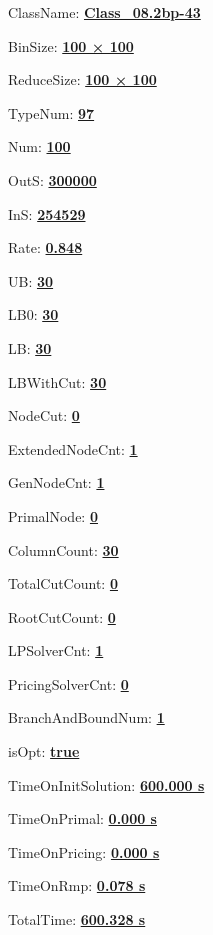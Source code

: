 \documentclass[11pt]{article}
\begin{document}
\pagestyle{empty}


ClassName: \underline{\textbf{Class_08.2bp-43}}
\par
BinSize: \underline{\textbf{100 × 100}}
\par
ReduceSize: \underline{\textbf{100 × 100}}
\par
TypeNum: \underline{\textbf{97}}
\par
Num: \underline{\textbf{100}}
\par
OutS: \underline{\textbf{300000}}
\par
InS: \underline{\textbf{254529}}
\par
Rate: \underline{\textbf{0.848}}
\par
UB: \underline{\textbf{30}}
\par
LB0: \underline{\textbf{30}}
\par
LB: \underline{\textbf{30}}
\par
LBWithCut: \underline{\textbf{30}}
\par
NodeCut: \underline{\textbf{0}}
\par
ExtendedNodeCnt: \underline{\textbf{1}}
\par
GenNodeCnt: \underline{\textbf{1}}
\par
PrimalNode: \underline{\textbf{0}}
\par
ColumnCount: \underline{\textbf{30}}
\par
TotalCutCount: \underline{\textbf{0}}
\par
RootCutCount: \underline{\textbf{0}}
\par
LPSolverCnt: \underline{\textbf{1}}
\par
PricingSolverCnt: \underline{\textbf{0}}
\par
BranchAndBoundNum: \underline{\textbf{1}}
\par
isOpt: \underline{\textbf{true}}
\par
TimeOnInitSolution: \underline{\textbf{600.000 s}}
\par
TimeOnPrimal: \underline{\textbf{0.000 s}}
\par
TimeOnPricing: \underline{\textbf{0.000 s}}
\par
TimeOnRmp: \underline{\textbf{0.078 s}}
\par
TotalTime: \underline{\textbf{600.328 s}}
\par
\newpage


\end{document}

